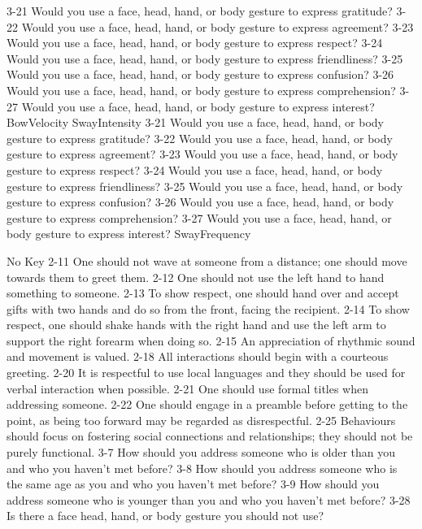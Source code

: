 	3-21 Would you use a face, head, hand, or body gesture to express gratitude?
	3-22 Would you use a face,  head, hand, or body gesture to express agreement?
	3-23 Would you use a face,  head, hand, or body gesture to express  respect?
	3-24 Would you use a face,  head, hand, or body gesture to express friendliness?
	3-25 Would you use a face,  head, hand, or body gesture to express  confusion?
	3-26 Would you use a face,  head, hand, or body gesture to express comprehension? 
	3-27 Would you use a face,  head, hand, or body gesture to express interest?
BowVelocity
SwayIntensity
	3-21 Would you use a face, head, hand, or body gesture to express gratitude?
	3-22 Would you use a face,  head, hand, or body gesture to express agreement?
	3-23 Would you use a face,  head, hand, or body gesture to express  respect?
	3-24 Would you use a face,  head, hand, or body gesture to express friendliness?
	3-25 Would you use a face,  head, hand, or body gesture to express  confusion?
	3-26 Would you use a face,  head, hand, or body gesture to express comprehension? 
	3-27 Would you use a face,  head, hand, or body gesture to express interest?
SwayFrequency

 No Key
 	2-11 One should not wave at someone from a distance; one should move towards them to greet them.
	2-12 One should not use the left hand to hand something to someone.
	2-13 To show respect, one should hand over and accept gifts with two hands and do so from the front, facing the recipient.
	2-14 To show respect, one should shake hands with the right hand and use the left arm to support the right forearm when doing so.
 	2-15 An appreciation of rhythmic sound and movement is valued. 
	2-18 All interactions should begin with a courteous greeting.
	2-20 It is respectful to use local languages and they should be used for verbal interaction when possible. 
	2-21 One should use formal titles when addressing someone.
	2-22 One should engage in a preamble before getting to the point, as being too forward may be regarded as disrespectful.
	2-25 Behaviours should focus on fostering social connections and relationships; they should not be purely functional.
	3-7 How should you address someone who is older than you and who you haven't met before?
	3-8 How should you address someone who is the same age as you and who you haven't met before?
	3-9 How should you address someone who is younger than you and who you haven't met before?
	3-28 Is there  a face head, hand, or body gesture you should not use?

